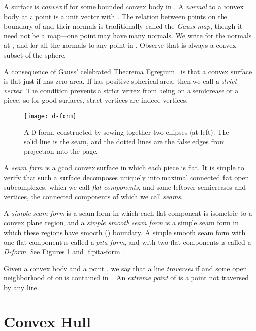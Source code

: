 \documentclass{article}
\newcommand\term[1]{{\it #1}}
\begin{document}
A surface  is \term{convex} if  for some bounded
convex body  in .
A \term{normal} to a convex
body  at a point  is a unit vector  with .
The relation between points on the boundary of  and their normals
is traditionally called the \term{Gauss map}, though it need not be a
map---one point may have many normals.  We write  for the
normals at , and  for all the normals to any point in .  Observe that  is always a convex subset of the sphere.

A consequence of Gauss' celebrated Theorema Egregium~\cite{Gauss}
is that a convex surface  is flat just if  has zero area.
If  has positive spherical area, then we call  a \term{strict
  vertex}.  The  condition prevents a strict vertex  from being
on a semicrease or a piece, so for good surfaces, strict vertices
are indeed vertices.

\begin{figure}[tb]
  \centering
  \texttt{[image: d-form]}
  \caption{A D-form, constructed by sewing together two ellipses (at
    left).  The solid line is the seam, and the dotted lines are
    the false edges from projection into the page.}
  \label{f:d-form}
\end{figure}

A \term{seam form}  is a good convex surface in which each piece
 is flat.  It is simple to verify that such a surface decomposes
uniquely into maximal connected flat open subcomplexes, which we call
\term{flat components}, and some leftover semicreases and vertices,
the connected components of which we call \term{seams}.

A \term{simple seam form} is a seam form in which each flat component
is isometric to a convex plane region, and a \term{simple smooth seam
  form} is a simple seam form in which these regions have smooth
() boundary.
A simple smooth seam form with one flat component is called a \term{pita
  form}, and with two flat components is called a \term{D-form}.
See Figures \ref{f:d-form} and \ref{f:pita-form}.

Given a convex body  and a point , we say that a line  \term{traverses}  if 
and some open neighborhood of  on  is contained in~.  An
\term{extreme point} of  is a point  not traversed by any
line.



\section{Convex Hull}
\label{sec:convex-hull}
\end{document}

